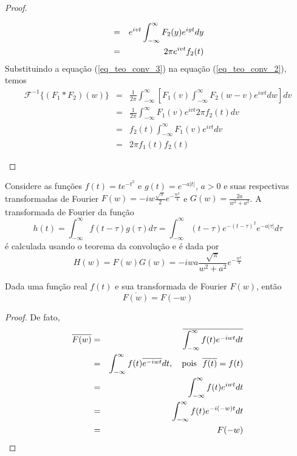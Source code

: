 \begin{proof}
\begin{itemize}
\begin{eqnarray}
\nonumber &=&e^{ivt}\int_{-\infty}^\infty F_2(y)e^{iyt}dy \\
&=&2\pi e^{ivt}f_2(t) {\label{eq_teo_conv_3}}
\end{eqnarray}
Substituindo a equação (\ref{eq_teo_conv_3}) na equação (\ref{eq_teo_conv_2}), temos
\begin{eqnarray*}
\mathcal{F}^{-1}\{(F_1*F_2)(w)\}&=&\frac{1}{2\pi}\int_{-\infty}^\infty\left[ F_1(v) \int_{-\infty}^\infty F_2(w-v)e^{iwt}dw \right]dv\\
&=&\frac{1}{2\pi}\int_{-\infty}^\infty  F_1(v) e^{ivt} 2\pi f_2(t) dv\\
&=&f_2(t)\int_{-\infty}^\infty F_1(v) e^{ivt} dv\\
&=&2\pi f_1(t)f_2(t)
\end{eqnarray*}
\end{itemize}
\end{proof}
\begin{ex}Considere as funções $f(t)=te^{-t^2}$ e $g(t)=e^{-a|t|}$, $a>0$ e suas respectivas transformadas de Fourier $F(w)=-iw\frac{\sqrt{\pi}}{2}e^{-\frac{w^2}{4}}$ e $G(w)=\frac{2a}{w^2+a^2}$. A transformada de Fourier da função 
\begin{equation}
h(t)=\int_{-\infty}^\infty f(t-\tau)g(\tau)d\tau=\int_{-\infty}^\infty (t-\tau)e^{-(t-\tau)^2}e^{-a|\tau|}d\tau
\end{equation}
é calculada usando o teorema da convolução e é dada por
\begin{equation}
H(w)=F(w)G(w)=-iwa\frac{\sqrt{\pi}}{w^2+a^2}e^{-\frac{w^2}{4}}
\end{equation}
\end{ex}
\begin{teo}[Conjugação] \label{prop_conj}Dada uma função real $f(t)$ e sua transformada de Fourier $F(w)$, então
\begin{equation}
\overline{F(w)}=F(-w)
\end{equation}
\end{teo}
\begin{proof}
De fato,
\begin{eqnarray*}
\overline{F(w)}&=&\overline{\int_{-\infty}^\infty f(t)e^{-iwt}dt}\\
&=&\int_{-\infty}^\infty f(t)\overline{e^{-iwt}}dt,\quad \hbox{pois}\ \ \overline{f(t)}=f(t) \\
&=&\int_{-\infty}^\infty f(t)e^{iwt}dt\\
&=&\int_{-\infty}^\infty f(t)e^{-i(-w)t}dt\\
&=&F(-w)
\end{eqnarray*}
\end{proof}
